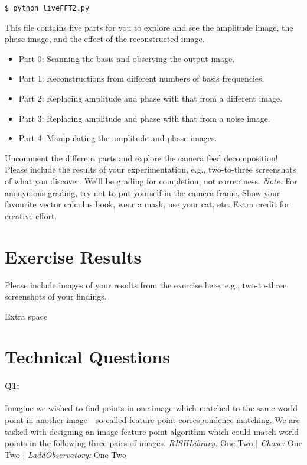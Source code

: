 \begin{verbatim}
$ python liveFFT2.py
\end{verbatim}

This file contains five parts for you to explore and see the amplitude image, the phase image, and the effect of the reconstructed image.
\begin{itemize}
    \item Part 0: Scanning the basis and observing the output image.
    \item Part 1: Reconstructions from different numbers of basis frequencies.
    \item Part 2: Replacing amplitude and phase with that from a different image.
    \item Part 3: Replacing amplitude and phase with that from a noise image.
    \item Part 4: Manipulating the amplitude and phase images.
\end{itemize}

Uncomment the different parts and explore the camera feed decomposition! Please include the results of your experimentation, e.g., two-to-three screenshots of what you discover. We'll be grading for completion, not correctness. \emph{Note:} For anonymous grading, try not to put yourself in the camera frame. Show your favourite vector calculus book, wear a mask, use your cat, etc. Extra credit for creative effort.


\pagebreak
\section*{Exercise Results}
Please include images of your results from the exercise here, e.g., two-to-three screenshots of your findings.




\pagebreak
Extra space





\pagebreak
\section*{Technical Questions}

\paragraph{Q1:} Imagine we wished to find points in one image which matched to the same world point in another image---so-called feature point correspondence matching. We are tasked with designing an image feature point algorithm which could match world points in the following three pairs of images.
\newline
\newline
\emph{RISHLibrary:} \href{RISHLibrary1.jpg}{One} \href{RISHLibrary2.jpg}{Two} | \emph{Chase:} \href{Chase1.jpg}{One} \href{Chase2.jpg}{Two} | \emph{LaddObservatory:} \href{LaddObservatory1.jpg}{One} \href{LaddObservatory2.jpg}{Two}

